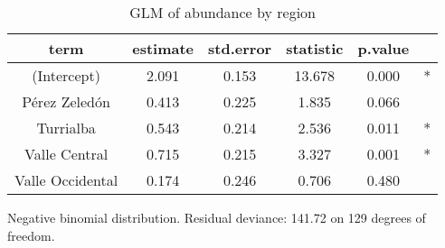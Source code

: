 \begin{table}[!h]
\centering
\caption{\label{tab:glm_abun}GLM of abundance by region}
\centering
\fontsize{9}{11}\selectfont
\begin{threeparttable}
\begin{tabular}[t]{cccccc}
\hline\hline
term & estimate & std.error & statistic & p.value &  \\
\midrule
(Intercept) & 2.091 & 0.153 & 13.678 & 0.000 & *\\
Pérez Zeledón & 0.413 & 0.225 & 1.835 & 0.066 & \\
Turrialba & 0.543 & 0.214 & 2.536 & 0.011 & *\\
Valle Central & 0.715 & 0.215 & 3.327 & 0.001 & *\\
Valle Occidental & 0.174 & 0.246 & 0.706 & 0.480 & \\
\hline\hline
\end{tabular}
\begin{tablenotes}[para]
\item Negative binomial distribution. Residual deviance: 141.72 on 129 degrees of freedom.
\end{tablenotes}
\end{threeparttable}
\end{table}

